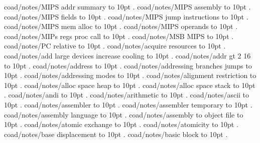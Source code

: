\smallskip
coad/notes/MIPS addr summary \leaders\hbox to 10pt {\hss.\hss}  \hfill {}
\smallskip
coad/notes/MIPS assembly \leaders\hbox to 10pt {\hss.\hss}  \hfill {}
\smallskip
coad/notes/MIPS fields \leaders\hbox to 10pt {\hss.\hss}  \hfill {}
\smallskip
coad/notes/MIPS jump instructions \leaders\hbox to 10pt {\hss.\hss}  \hfill {}
\smallskip
coad/notes/MIPS mem alloc \leaders\hbox to 10pt {\hss.\hss}  \hfill {}
\smallskip
coad/notes/MIPS operands \leaders\hbox to 10pt {\hss.\hss}  \hfill {}
\smallskip
coad/notes/MIPs regs proc call \leaders\hbox to 10pt {\hss.\hss}  \hfill {}
\smallskip
coad/notes/MSB MIPS \leaders\hbox to 10pt {\hss.\hss}  \hfill {}
\smallskip
coad/notes/PC relative \leaders\hbox to 10pt {\hss.\hss}  \hfill {}
\smallskip
coad/notes/acquire resources \leaders\hbox to 10pt {\hss.\hss}  \hfill {}
\smallskip
coad/notes/add large devices increase cooling \leaders\hbox to 10pt {\hss.\hss}  \hfill {}
\smallskip
coad/notes/addr gt 2 16 \leaders\hbox to 10pt {\hss.\hss}  \hfill {}
\smallskip
coad/notes/address \leaders\hbox to 10pt {\hss.\hss}  \hfill {}
\smallskip
coad/notes/addressing branches jumps \leaders\hbox to 10pt {\hss.\hss}  \hfill {}
\smallskip
coad/notes/addressing modes \leaders\hbox to 10pt {\hss.\hss}  \hfill {}
\smallskip
coad/notes/alignment restriction \leaders\hbox to 10pt {\hss.\hss}  \hfill {}
\smallskip
coad/notes/alloc space heap \leaders\hbox to 10pt {\hss.\hss}  \hfill {}
\smallskip
coad/notes/alloc space stack \leaders\hbox to 10pt {\hss.\hss}  \hfill {}
\smallskip
coad/notes/andi \leaders\hbox to 10pt {\hss.\hss}  \hfill {}
\smallskip
coad/notes/arithmetic \leaders\hbox to 10pt {\hss.\hss}  \hfill {}
\smallskip
coad/notes/ascii \leaders\hbox to 10pt {\hss.\hss}  \hfill {}
\smallskip
coad/notes/assembler \leaders\hbox to 10pt {\hss.\hss}  \hfill {}
\smallskip
coad/notes/assembler temporary \leaders\hbox to 10pt {\hss.\hss}  \hfill {}
\smallskip
coad/notes/assembly language \leaders\hbox to 10pt {\hss.\hss}  \hfill {}
\smallskip
coad/notes/assembly to object file \leaders\hbox to 10pt {\hss.\hss}  \hfill {}
\smallskip
coad/notes/atomic exchange \leaders\hbox to 10pt {\hss.\hss}  \hfill {}
\smallskip
coad/notes/atomicity \leaders\hbox to 10pt {\hss.\hss}  \hfill {}
\smallskip
coad/notes/base displacement \leaders\hbox to 10pt {\hss.\hss}  \hfill {}
\smallskip
coad/notes/basic block \leaders\hbox to 10pt {\hss.\hss}  \hfill {}
